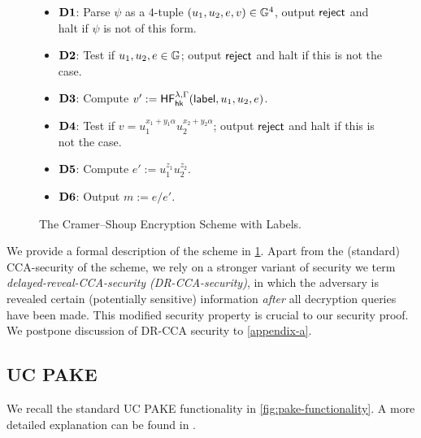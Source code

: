 \begin{figure}[tbp]
\begin{framed}
		\begin{itemize}
			\itemsep=0em
			\item[]\textbf{$\mathbf{D1}$}: Parse $\psi$ as a $4$-tuple $(u_1,u_2,e,v)\in\mathbb{G}^4$, output $\mathsf{reject}$ and halt if $\psi$ is not of this form.
			\item[]\textbf{$\mathbf{D2}$}: Test if $u_1, u_2, e \in \mathbb{G}$; output $\mathsf{reject}$ and halt if this is not the case.
			\item[]\textbf{$\mathbf{D3}$}: Compute $v':=\mathsf{HF}^{\lambda,\Gamma}_{\mathsf{hk}}(\mathsf{label},u_1,u_2,e)$.
			\item[]\textbf{$\mathbf{D4}$}: Test if $v = u_1^{x_1+y_1\alpha}u_2^{x_2+y_2\alpha}$; output $\mathsf{reject}$ and halt if this is not the case.
			\item[]\textbf{$\mathbf{D5}$}: Compute $e' := u_1^{z_1}u_2^{z_2}$.
			\item[]\textbf{$\mathbf{D6}$}: Output $m := e/e'$.
		\end{itemize}
	\end{framed}
	\caption{The Cramer--Shoup Encryption Scheme with Labels.}
	\label{fig:cs03}
	\end{figure}

We provide a formal description of the scheme in \cref{fig:cs03}. Apart from the (standard) CCA-security of the scheme, we rely on a stronger variant of security we term \textit{delayed-reveal-CCA-security (DR-CCA-security)}, in which the adversary is revealed certain (potentially sensitive) information \textit{after} all decryption queries have been made. This modified security property is crucial to our security proof. We postpone discussion of DR-CCA security to \cref{appendix-a}.

\subsection{UC PAKE}
	
	We recall the standard UC PAKE functionality \cite{EC:CHKLM05} in \cref{fig:pake-functionality}. A more detailed explanation can be found in \cite[Section~2.2]{PKC:RoyXu23}.
	
